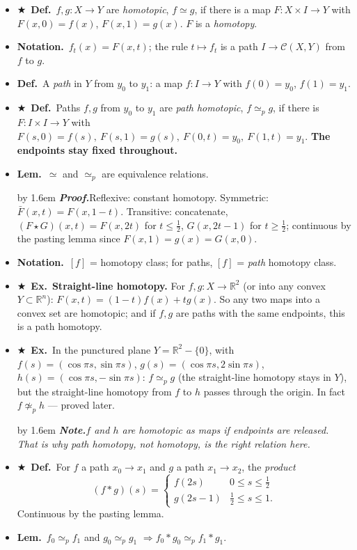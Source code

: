 \documentclass[12pt,a4paper]{article}
\newcommand{\Dfn}{\textbf{Def.}~}
\newcommand{\Lem}{\textbf{Lem.}~}
\newcommand{\Exa}{\textbf{Ex.}~}
\newcommand{\Ntn}{\textbf{Notation.}~}
\newcommand{\Key}{$\bigstar$~}                  %
\newcommand{\Pf}[1]{%
  \par\addvspace{7pt}\nopagebreak
  \begingroup
    \advance\leftskip by 1.6em
    \parindent=0pt \small\color{prf}%
    \textbf{\textit{Proof.}}\enspace #1\par
  \endgroup
  \addvspace{9pt}}
\newcommand{\Cue}[1]{%
  \par\addvspace{7pt}\nopagebreak
  \begingroup
    \advance\leftskip by 1.6em
    \parindent=0pt \small\color{cue}%
    \textbf{\textit{Note.}}\enspace \textit{#1}\par
  \endgroup
  \addvspace{9pt}}
\newenvironment{BL}%
  {\begin{itemize}[leftmargin=1.4em,labelsep=0.55em,itemsep=11pt,topsep=11pt,parsep=0pt]}%
  {\end{itemize}}
\newcommand{\RR}{\mathbb{R}}
\newcommand{\Map}{\mathscr{C}}
\newcommand{\imp}{\Rightarrow}
\begin{document}
\begin{BL}
\item \Key\Dfn $f,g\colon X\to Y$ are \emph{homotopic}, $f\simeq g$, if there is a map
      $F\colon X\times I\to Y$ with $F(x,0)=f(x)$, $F(x,1)=g(x)$. $F$ is a \emph{homotopy}.
\item \Ntn $f_t(x)=F(x,t)$; the rule $t\mapsto f_t$ is a path $I\to\Map(X,Y)$ from $f$ to $g$.
\item \Dfn A \emph{path} in $Y$ from $y_0$ to $y_1$: a map $f\colon I\to Y$ with
      $f(0)=y_0$, $f(1)=y_1$.
\item \Key\Dfn Paths $f,g$ from $y_0$ to $y_1$ are \emph{path homotopic}, $f\simeq_p g$,
      if there is $F\colon I\times I\to Y$ with
      \(F(s,0)=f(s),\ F(s,1)=g(s),\ F(0,t)=y_0,\ F(1,t)=y_1.\)
      \textbf{The endpoints stay fixed throughout.}
\item \Lem $\simeq$ and $\simeq_p$ are equivalence relations.
\Pf{Reflexive: constant homotopy. Symmetric: $\bar F(x,t)=F(x,1-t)$.
Transitive: concatenate,
$(F\star G)(x,t)=F(x,2t)$ for $t\le\tfrac12$, $G(x,2t-1)$ for $t\ge\tfrac12$;
continuous by the pasting lemma since $F(x,1)=g(x)=G(x,0)$.}
\item \Ntn $[f]$ = homotopy class; for paths, $[f]$ = \emph{path} homotopy class.
\item \Key\Exa \textbf{Straight-line homotopy.} For $f,g\colon X\to\RR^2$ (or into any convex
      $Y\subset\RR^n$): \; $F(x,t)=(1-t)f(x)+tg(x)$. So any two maps into a convex set are
      homotopic; and if $f,g$ are paths with the same endpoints, this is a path homotopy.
\item \Key\Exa In the punctured plane $Y=\RR^2-\{0\}$, with
      $f(s)=(\cos\pi s,\sin\pi s)$, $g(s)=(\cos\pi s,2\sin\pi s)$,
      $h(s)=(\cos\pi s,-\sin\pi s)$:
      $f\simeq_p g$ (the straight-line homotopy stays in $Y$), but the straight-line homotopy
      from $f$ to $h$ passes through the origin. In fact $f\not\simeq_p h$ --- proved later.
\Cue{$f$ and $h$ \emph{are} homotopic as maps if endpoints are released. That is why path
homotopy, not homotopy, is the right relation here.}
\item \Key\Dfn For $f$ a path $x_0\to x_1$ and $g$ a path $x_1\to x_2$, the \emph{product}
  \[
    (f*g)(s)=\begin{cases} f(2s) & 0\le s\le\tfrac12\\ g(2s-1) & \tfrac12\le s\le1.\end{cases}
  \]
  Continuous by the pasting lemma.
\item \Lem $f_0\simeq_p f_1$ and $g_0\simeq_p g_1$ $\imp f_0*g_0\simeq_p f_1*g_1$.

\end{BL}
\end{document}
